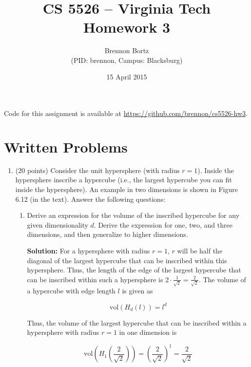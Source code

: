 \documentclass[11pt]{article}
\begin{document}
\title{CS 5526 -- Virginia Tech\\
	Homework 3}
\author{Brennon Bortz \\ (PID: brennon, Campus: Blacksburg)}
\date{15 April 2015}
\maketitle

Code for this assignment is available at \url{https://github.com/brennon/cs5526-hw3}.

\section*{Written Problems}

\begin{enumerate}

\item (20 points) Consider the unit hypersphere (with radius $r=1$). Inside the hypersphere inscribe a hypercube (i.e., the largest hypercube you can fit inside the hypersphere). An example in two dimensions is shown in Figure 6.12 (in the text). Answer the following questions:

\begin{enumerate}

\item Derive an expression for the volume of the inscribed hypercube for any given dimensionality $d$. Derive the expression for one, two, and three dimensions, and then generalize to higher dimensions.

\textbf{Solution:} For a hypersphere with radius $r=1$, $r$ will be half the diagonal of the largest hypercube that can be inscribed within this hypersphere. Thus, the length of the edge of the largest hypercube that can be inscribed within such a hypersphere is $2 \cdot \frac{1}{\sqrt{2}} = \frac{2}{\sqrt{2}}$. The volume of a hypercube with edge length $l$ is given as

\begin{equation}
\text{vol}(H_d(l)) = l^d
\end{equation}

Thus, the volume of the largest hypercube that can be inscribed within a hypersphere with radius $r=1$ in one dimension is

\begin{equation}
\text{vol}\left(H_1\left(\frac{2}{\sqrt{2}}\right)\right) = \left(\frac{2}{\sqrt{2}}\right)^1 = \frac{2}{\sqrt{2}}
\end{equation}


\end{enumerate}
\end{enumerate}
\end{document}
